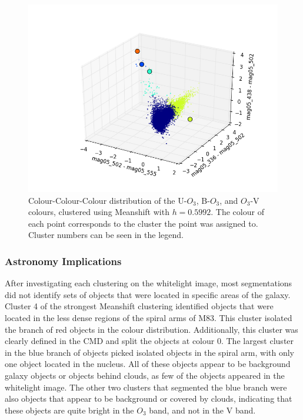 \begin{figure}
\centering
\includegraphics[width=\linewidth]{figs/meanshift_3d_color_5cl_mag05_502-mag05_555vsmag05_336-mag05_502vsmag05_438-mag05_502}
\caption{Colour-Colour-Colour distribution of the U-$O_{3}$, B-$O_{3}$, and $O_{3}$-V colours, clustered using Meanshift with $h=0.5992$. The colour of each point corresponds to the cluster the point was assigned to. Cluster numbers can be seen in the legend.}
\label{fig:fig:OIIIVMS3d}
\end{figure}

\subsubsection{Astronomy Implications}
After investigating each clustering on the whitelight image, most segmentations did not identify sets of objects that were located in specific areas of the galaxy.
Cluster 4 of the strongest Meanshift clustering identified objects that were located in the less dense regions of the spiral arms of M83.
This cluster isolated the branch of red objects in the colour distribution. Additionally, this cluster was clearly defined in the CMD and split the objects at colour 0.
The largest cluster in the blue branch of objects picked isolated objects in the spiral arm, with only one object located in the nucleus.
All of these objects appear to be background galaxy objects or objects behind clouds, as few of the objects appeared in the whitelight image.
The other two clusters that segmented the blue branch were also objects that appear to be background or covered by clouds, indicating that these objects are quite bright in the $O_{3}$ band, and not in the V band.

